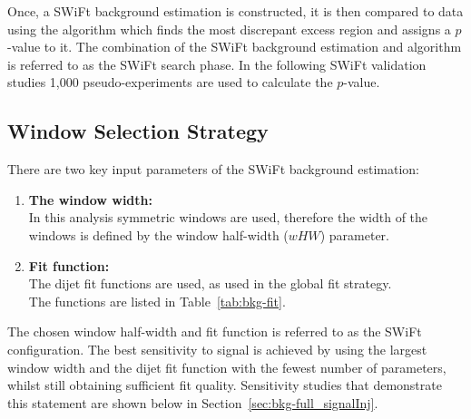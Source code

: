 Once, a SWiFt background estimation is constructed,
it is then compared to data using the \bh{} algorithm which finds the most discrepant excess region and assigns a \mbox{$p$-value} to it.
The combination of the SWiFt background estimation and \bh{} algorithm is referred to as the SWiFt search phase.
In the following SWiFt validation studies 1,000 pseudo-experiments are used to calculate the \bh{} \mbox{$p$-value}.

\subsection{Window Selection Strategy}
\label{sec:bkg-full_windowSel}

There are two key input parameters of the SWiFt background estimation:
\begin{enumerate}[leftmargin=*]
\item \textbf{The window width:}\\
  In this analysis symmetric windows are used, therefore the width of the windows is defined by the window half-width ($wHW$) parameter.\vspace{0.5em}
\item \textbf{Fit function:}\\
  The dijet fit functions are used, as used in the global fit strategy. \\
  The functions are listed in Table~\ref{tab:bkg-fit}.
\end{enumerate}
The chosen window half-width and fit function is referred to as the SWiFt configuration.
The best sensitivity to signal is achieved by using the largest window width and the dijet fit function with the fewest number of parameters, whilst still obtaining sufficient fit quality.
Sensitivity studies that demonstrate this statement are shown below in Section~\ref{sec:bkg-full_signalInj}.

